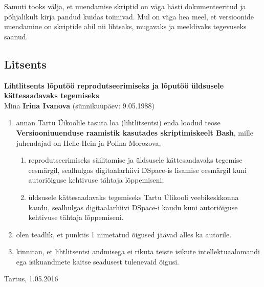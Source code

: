 \documentclass[12pt]{report}
\begin{document}
Samuti tooks välja, et uuendamise skriptid on väga hästi dokumenteeritud ja põhjalikult kirja pandud kuidas toimivad. Mul on väga hea meel, et versioonide uuendamine on skriptide abil nii lihtsaks, mugavaks ja meeldivaks tegevuseks saanud.

  \newpage

  \subsection*{Litsents}
  
  \textbf{Lihtlitsents lõputöö reprodutseerimiseks ja lõputöö üldsusele kättesaadavaks tegemiseks}\\
  
  Mina \textbf{Irina Ivanova} (sünnikuupäev: 9.05.1988)
  \begin{enumerate}
    \item annan Tartu Üikoolile tasuta loa (lihtlitsentsi) enda loodud teose \textbf{Versiooniuuenduse raamistik kasutades skriptimiskeelt Bash}, mille juhendajad on Helle Hein ja Polina Morozova,
    \begin{enumerate}
      \item reprodutseerimiseks säilitamise ja üldsusele kättesaadavaks tegemise eesmärgil, sealhulgas digitaalarhiivi DSpace-is lisamise eesmärgil kuni autoriõiguse kehtivuse tähtaja lõppemiseni;
      \item üldsusele kättesaadavaks tegemiseks Tartu Ülikooli veebikeskkonna kaudu, sealhulgas digitaalarhiivi DSpace-i kaudu kuni autoriõiguse kehtivuse tähtaja lõppemiseni.
    \end{enumerate}
    \item olen teadlik, et punktis 1 nimetatud õigused jäävad alles ka autorile.
    \item kinnitan, et lihtlitsentsi andmisega ei rikuta teiste isikute intellektuaalomandi ega isikuandmete kaitse seadusest tulenevaid õigusi.
  \end{enumerate}
  
  Tartus, 1.05.2016
\end{document}
